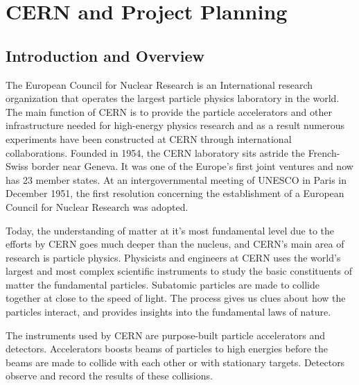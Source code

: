 \let\textcircled=\pgftextcircled
\chapter{CERN and Project Planning}
\label{chap:ch3}

\section{Introduction and Overview}
The European Council for Nuclear Research is an International research organization that operates the largest particle physics laboratory in the world.  The main function of CERN is to provide the particle accelerators and other infrastructure needed for high-energy physics research and as a result numerous experiments have been constructed at CERN through international collaborations. Founded in 1954, the CERN laboratory sits astride the French-Swiss border near Geneva. It was one of the Europe's first joint ventures and now has 23 member states. At an intergovernmental meeting of UNESCO in Paris in December 1951, the first resolution concerning the establishment of a European Council for Nuclear Research was adopted.

Today, the understanding of matter at it's most fundamental level due to the efforts by CERN goes much deeper than the nucleus, and CERN’s main area of research is particle physics. Physicists and engineers at CERN uses the world’s largest and most complex scientific instruments to study the basic constituents of matter the fundamental particles. Subatomic particles are made to collide together at close to the speed of light. The process gives us clues about how the particles interact, and provides insights into the fundamental laws of nature.

The instruments used by CERN are purpose-built particle accelerators and detectors. Accelerators boosts beams of particles to high energies before the beams are made to collide with each other or with stationary targets. Detectors observe and record the results of these collisions.


